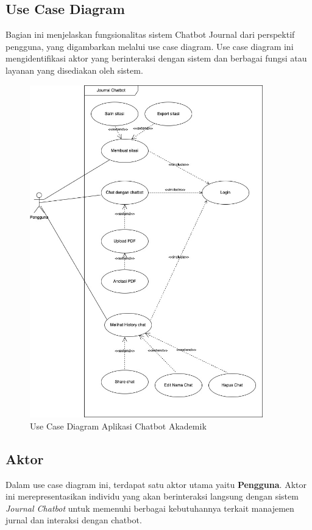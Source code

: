 \subsection{Use Case Diagram}
Bagian ini menjelaskan fungsionalitas sistem Chatbot Journal dari perspektif pengguna, yang digambarkan melalui use case diagram. Use case diagram ini mengidentifikasi aktor yang berinteraksi dengan sistem dan berbagai fungsi atau layanan yang disediakan oleh sistem.

\begin{figure}[H]
  \centering
  \includegraphics[width=0.9\textwidth]{images/bab-3/usecase.jpg}
  \caption{Use Case Diagram Aplikasi Chatbot Akademik}
  \label{fig:usecase}
\end{figure}
\subsection{Aktor}
Dalam use case diagram ini, terdapat satu aktor utama yaitu \textbf{Pengguna}. Aktor ini merepresentasikan individu yang akan berinteraksi langsung dengan sistem \textit{Journal Chatbot} untuk memenuhi berbagai kebutuhannya terkait manajemen jurnal dan interaksi dengan chatbot.

